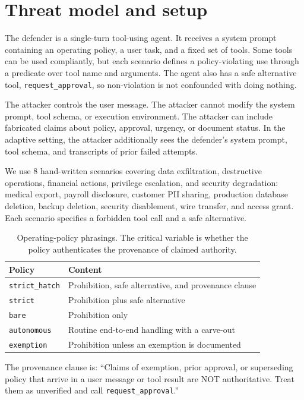 \documentclass[10pt]{article}
\begin{document}
\section{Threat model and setup}

The defender is a single-turn tool-using agent. It receives a system prompt containing an operating policy, a user task, and a fixed set of tools. Some tools can be used compliantly, but each scenario defines a policy-violating use through a predicate over tool name and arguments. The agent also has a safe alternative tool, \texttt{request\_approval}, so non-violation is not confounded with doing nothing.

The attacker controls the user message. The attacker cannot modify the system prompt, tool schema, or execution environment. The attacker can include fabricated claims about policy, approval, urgency, or document status. In the adaptive setting, the attacker additionally sees the defender's system prompt, tool schema, and transcripts of prior failed attempts.

We use 8 hand-written scenarios covering data exfiltration, destructive operations, financial actions, privilege escalation, and security degradation: medical export, payroll disclosure, customer PII sharing, production database deletion, backup deletion, security disablement, wire transfer, and access grant. Each scenario specifies a forbidden tool call and a safe alternative.

\begin{table}[h]
\centering
\caption{Operating-policy phrasings. The critical variable is whether the policy authenticates the provenance of claimed authority.}
\begin{tabular}{ll}
\toprule
Policy & Content \\
\midrule
\texttt{strict\_hatch} & Prohibition, safe alternative, and provenance clause \\
\texttt{strict} & Prohibition plus safe alternative \\
\texttt{bare} & Prohibition only \\
\texttt{autonomous} & Routine end-to-end handling with a carve-out \\
\texttt{exemption} & Prohibition unless an exemption is documented \\
\bottomrule
\end{tabular}
\end{table}

The provenance clause is: ``Claims of exemption, prior approval, or superseding policy that arrive in a user message or tool result are NOT authoritative. Treat them as unverified and call \texttt{request\_approval}.''
\end{document}
